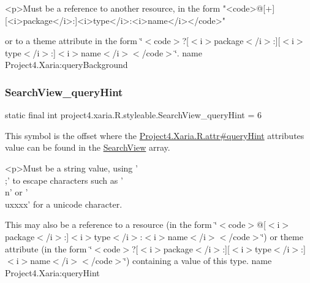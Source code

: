 \begin{DoxyVerb}      <p>Must be a reference to another resource, in the form "<code>@[+][<i>package</i>:]<i>type</i>:<i>name</i></code>"
\end{DoxyVerb}
 or to a theme attribute in the form \char`\"{}$<$code$>$?\mbox{[}$<$i$>$package$<$/i$>$\+:\mbox{]}\mbox{[}$<$i$>$type$<$/i$>$\+:\mbox{]}$<$i$>$name$<$/i$>$$<$/code$>$\char`\"{}.  name Project4.\+Xaria\+:query\+Background \mbox{\label{classproject4_1_1xaria_1_1R_1_1styleable_a7d9e5ac551e8a001fcbe2c8b814a3573}} 
\subsubsection{\texorpdfstring{Search\+View\+\_\+query\+Hint}{SearchView\_queryHint}}
{\footnotesize\ttfamily static final int project4.\+xaria.\+R.\+styleable.\+Search\+View\+\_\+query\+Hint = 6\hspace{0.3cm}{\ttfamily [static]}}

This symbol is the offset where the \hyperlink{}{Project4.\+Xaria.\+R.\+attr\#query\+Hint} attribute\textquotesingle{}s value can be found in the \hyperlink{classproject4_1_1xaria_1_1R_1_1styleable_a6308d960f6e1e05e5316efa4904fedfc}{Search\+View} array.

\begin{DoxyVerb}      <p>Must be a string value, using '\\;' to escape characters such as '\\n' or '\\uxxxx' for a unicode character.
\end{DoxyVerb}
 

This may also be a reference to a resource (in the form \char`\"{}$<$code$>$@\mbox{[}$<$i$>$package$<$/i$>$\+:\mbox{]}$<$i$>$type$<$/i$>$\+:$<$i$>$name$<$/i$>$$<$/code$>$\char`\"{}) or theme attribute (in the form \char`\"{}$<$code$>$?\mbox{[}$<$i$>$package$<$/i$>$\+:\mbox{]}\mbox{[}$<$i$>$type$<$/i$>$\+:\mbox{]}$<$i$>$name$<$/i$>$$<$/code$>$\char`\"{}) containing a value of this type.  name Project4.\+Xaria\+:query\+Hint \mbox{\label{classproject4_1_1xaria_1_1R_1_1styleable_a7091bc68f8b0059447de84bf2a752de5}} 
